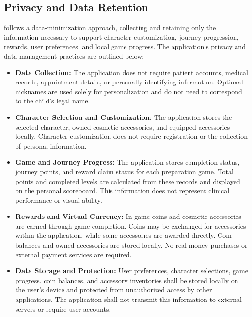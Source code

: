 \documentclass[12pt]{article}
\begin{document}
\subsection{Privacy and Data Retention}

\progname{} follows a data-minimization approach,
collecting and retaining only the information necessary
to support character customization, journey progression,
rewards, user preferences, and local game progress.
The application's privacy and data management
practices are outlined below:

\begin{itemize}

    \item \textbf{Data Collection:}
    The application does not require patient accounts,
    medical records, appointment details, or personally
    identifying information. Optional nicknames are
    used solely for personalization and do not need
    to correspond to the child's legal name.

    \item \textbf{Character Selection and Customization:}
    The application stores the selected character,
    owned cosmetic accessories, and equipped accessories
    locally. Character customization does not require
    registration or the collection of personal information.

    \item \textbf{Game and Journey Progress:}
    The application stores completion status, journey
    points, and reward claim status for each preparation
    game. Total points and completed levels are calculated
    from these records and displayed on the personal
    scoreboard. This information does not represent
    clinical performance or visual ability.

    \item \textbf{Rewards and Virtual Currency:}
    In-game coins and cosmetic accessories are earned
    through game completion. Coins may be exchanged
    for accessories within the application, while
    some accessories are awarded directly.
    Coin balances and owned accessories are stored
    locally. No real-money purchases or external
    payment services are required.

    \item \textbf{Data Storage and Protection:}
    User preferences, character selections, game
    progress, coin balances, and accessory inventories
    shall be stored locally on the user's device
    and protected from unauthorized access by other
    applications. The application shall not transmit
    this information to external servers or require
    user accounts.


\end{itemize}
\end{document}
